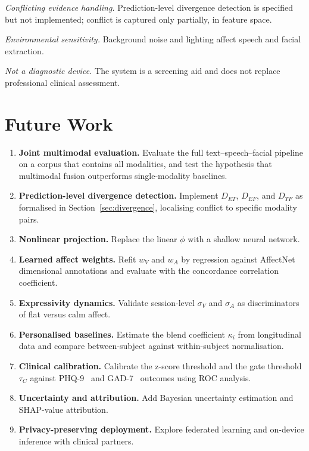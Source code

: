 \documentclass[12pt]{article}
\begin{document}
\emph{Conflicting evidence handling.} Prediction-level divergence
detection is specified but not implemented; conflict is captured only
partially, in feature space.

\emph{Environmental sensitivity.} Background noise and lighting affect
speech and facial extraction.

\emph{Not a diagnostic device.} The system is a screening aid and does
not replace professional clinical assessment.

\section{Future Work}
\label{sec:future}

\begin{enumerate}
  \item \textbf{Joint multimodal evaluation.} Evaluate the full
        text--speech--facial pipeline on a corpus that contains all
        modalities, and test the hypothesis that multimodal fusion
        outperforms single-modality baselines.
  \item \textbf{Prediction-level divergence detection.} Implement
        $D_{ET}$, $D_{EF}$, and $D_{TF}$ as formalised in
        Section~\ref{sec:divergence}, localising conflict to specific
        modality pairs.
  \item \textbf{Nonlinear projection.} Replace the linear $\phi$ with a
        shallow neural network.
  \item \textbf{Learned affect weights.} Refit $w_V$ and $w_A$ by
        regression against AffectNet dimensional annotations and
        evaluate with the concordance correlation coefficient.
  \item \textbf{Expressivity dynamics.} Validate session-level
        $\sigma_V$ and $\sigma_A$ as discriminators of flat versus calm
        affect.
  \item \textbf{Personalised baselines.} Estimate the blend coefficient
        $\kappa_i$ from longitudinal data and compare
        between-subject against within-subject normalisation.
  \item \textbf{Clinical calibration.} Calibrate the z-score threshold
        and the gate threshold $\tau_C$ against PHQ-9~\cite{kroenke2001phq9}
        and GAD-7~\cite{spitzer2006gad7} outcomes using ROC analysis.
  \item \textbf{Uncertainty and attribution.} Add Bayesian uncertainty
        estimation and SHAP-value attribution.
  \item \textbf{Privacy-preserving deployment.} Explore federated
        learning and on-device inference with clinical partners.
\end{enumerate}
\end{document}
